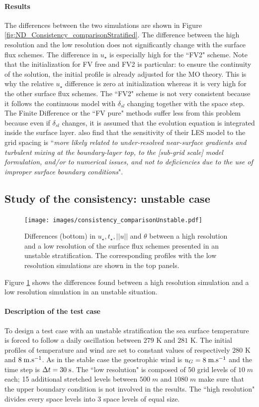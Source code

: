 \paragraph{Results} The differences between the two simulations are shown in Figure
\ref{fig:ND_Consistency_comparisonStratified}.
The difference between the high resolution and the low resolution
does not significantly change with the surface flux schemes.
The difference in $u_\star$ is especially high for the ``FV2" scheme.
Note that the initialization for FV free and FV2 is particular:
to ensure the continuity of the solution,
the initial profile is already adjusted for the
MO theory. This is why the relative $u_\star$ difference is zero
at initialization whereas it is very high for the other surface flux
schemes.
%
The ``FV2" scheme is not very consistent because it follows the
continuous model with $\delta_{sl}$ changing together with the
space step.
The Finite Difference or the ``FV pure" methods suffer
less from this problem because even if $\delta_{sl}$ changes,
it is assumed that the evolution equation is
integrated inside the surface layer.
\cite{maronga_improved_2020} also find that the
sensitivity of their LES model to the grid spacing is
``\textit{more
likely related to under-resolved near-surface gradients
and turbulent mixing at the boundary-layer top, to the
[sub-grid scale] model formulation, and/or to numerical issues,
and not to deficiencies due to the use of improper surface
boundary conditions}".
\subsection{Study of the consistency: unstable case}
\begin{figure}
	\centering
	\texttt{[image: images/consistency\_comparisonUnstable.pdf]}
	\caption{Differences (bottom) in $u_\star, t_\star, ||u||$ and $\theta$
	between a high resolution and a low resolution
	of the surface flux schemes presented in an unstable
	stratification. The corresponding profiles
	with the low resolution simulations are shown in
	the top panels.
	}
	\label{fig:ND_Consistency_comparisonUnstable}
\end{figure}
Figure \ref{fig:ND_Consistency_comparisonUnstable}
shows the differences found between a high resolution simulation
and a low resolution simulation in an unstable situation.
\paragraph{Description of the test case}
To design a test case with an unstable stratification
the sea surface temperature is forced to follow a daily oscillation
between $279$ K and $281$ K.
The initial profiles of temperature and wind
are set to constant values of respectively $280$ K and
$8 \; {\rm m}.{\rm s}^{-1}$.
As in the stable case the geostrophic wind is
$u_G = 8 \;{\rm m}.{\rm s}^{-1}$
and the time step is $\Delta t = 30 \;{\rm s}$.
The ``low resolution" is composed of 50 grid levels of $10 \; m$
each; 15 additional stretched levels between $500 \; m$ and
$1080 \; m$ make sure that the upper boundary condition
is not involved in the results.
The ``high resolution" divides every space levels into
3 space levels of equal size.
